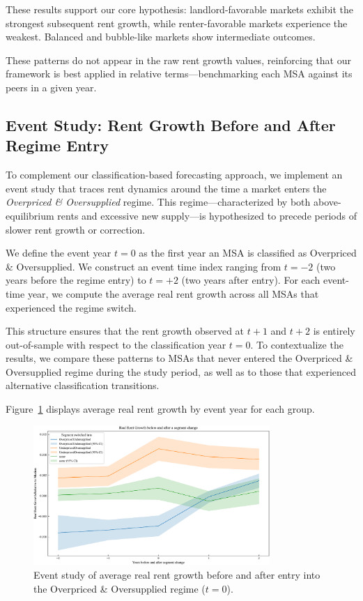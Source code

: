 \documentclass[APA,Times1COL]{WileyNJDv5} %
\begin{document}
These results support our core hypothesis: landlord-favorable markets exhibit the strongest subsequent rent growth, while renter-favorable markets experience the weakest. Balanced and bubble-like markets show intermediate outcomes.





These patterns do not appear in the raw rent growth values, reinforcing that our framework is best applied in relative terms—benchmarking each MSA against its peers in a given year.
\subsection{Event Study: Rent Growth Before and After Regime Entry}

To complement our classification-based forecasting approach, we implement an event study that traces rent dynamics around the time a market enters the \emph{Overpriced \& Oversupplied} regime. This regime—characterized by both above-equilibrium rents and excessive new supply—is hypothesized to precede periods of slower rent growth or correction. 

We define the event year $t=0$ as the first year an MSA is classified as Overpriced \& Oversupplied. We construct an event time index ranging from $t = -2$ (two years before the regime entry) to $t = +2$ (two years after entry). For each event-time year, we compute the average real rent growth across all MSAs that experienced the regime switch.

This structure ensures that the rent growth observed at $t+1$ and $t+2$ is entirely out-of-sample with respect to the classification year $t=0$. To contextualize the results, we compare these patterns to MSAs that never entered the Overpriced \& Oversupplied regime during the study period, as well as to those that experienced alternative classification transitions.

Figure~\ref{fig:event_study} displays average real rent growth by event year for each group.

\begin{figure}[h]
	\centering
	\includegraphics[width=0.8\textwidth]{event_study.pdf}
	\caption*{Event study of average real rent growth before and after entry into the Overpriced \& Oversupplied regime ($t=0$).}
	\label{fig:event_study}
\end{figure}
\end{document}
